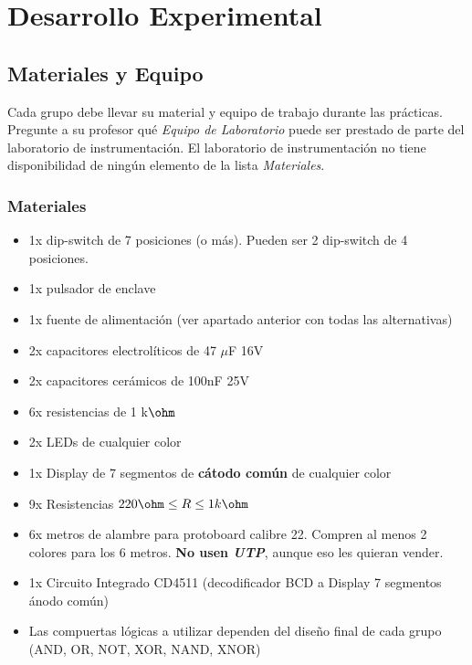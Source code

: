 \pagebreak

\section{Desarrollo Experimental}
\subsection{Materiales y Equipo}

Cada grupo debe llevar su material y equipo de trabajo durante las prácticas. Pregunte a su profesor qué \emph{Equipo de Laboratorio} puede ser prestado
de parte del laboratorio de instrumentación. El laboratorio de instrumentación no tiene disponibilidad de ningún elemento de la lista \emph{Materiales}.

\subsubsection*{Materiales}
\begin{itemize}
    \item 1x dip-switch de 7 posiciones (o más). Pueden ser 2 dip-switch de 4 posiciones.
    \item 1x pulsador de enclave
    \item 1x fuente de alimentación (ver apartado anterior con todas las alternativas)
    \item 2x capacitores electrolíticos de 47 $\mu$F 16V
    \item 2x capacitores cerámicos de 100nF 25V
    \item 6x resistencias de 1 k$\ohm$
    \item 2x LEDs de cualquier color
    \item 1x Display de 7 segmentos de \textbf{cátodo común} de cualquier color
    \item 9x Resistencias $220 \ohm \leq R \leq 1 k\ohm$
    \item 6x metros de alambre para protoboard calibre 22. Compren al menos 2 colores para los 6 metros. \textbf{No usen \emph{UTP}}, aunque eso les quieran vender.
    \item 1x Circuito Integrado CD4511 (decodificador BCD a Display 7 segmentos ánodo común)
    \item Las compuertas lógicas a utilizar dependen del diseño final de cada grupo (AND, OR, NOT, XOR, NAND, XNOR)
\end{itemize}



